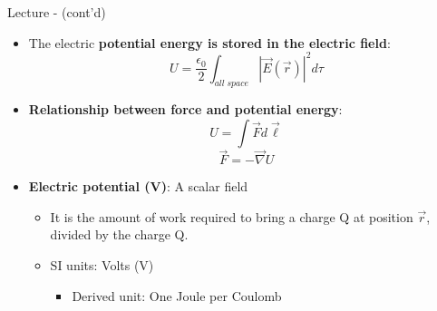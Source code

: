 \begin{frame}{Lecture \summarizedlecture - \lecturesummarytitle (cont'd)}

\begin{itemize}
  \item
  The electric {\bf potential energy is stored in the electric field}:
  \begin{equation*}
     U = \frac{\epsilon_0}{2} \int_{all\;space} |\vec{E}(\vec{r})|^2  d\tau
  \end{equation*}

  \item
  {\bf Relationship between force and potential energy}:\\
  \begin{equation*}
     U = \int \vec{F} d\vec{\ell}
  \end{equation*}
  \begin{equation*}
     \vec{F} = -\vec{\nabla}U
  \end{equation*}

  \item
  {\bf Electric potential (V)}: A scalar field
      \begin{itemize}
          \item It is the amount of work required to bring a charge Q at position $\vec{r}$, divided by the charge Q.
          \item SI units: Volts (V)
            \begin{itemize}
               \item Derived unit: One Joule per Coulomb
            \end{itemize}
      \end{itemize}
\end{itemize}

\end{frame}

%
%
%

